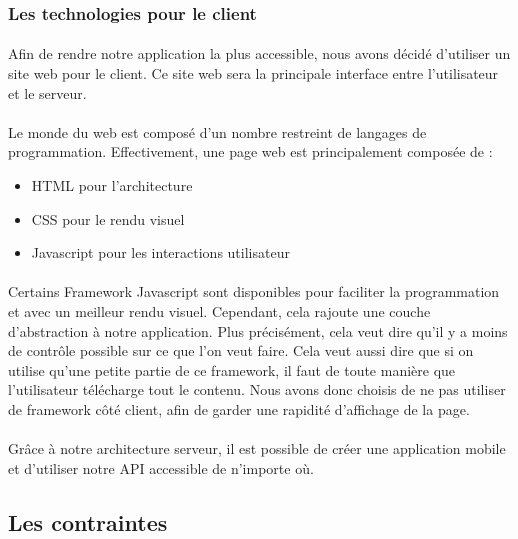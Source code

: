 \documentclass[a4paper, 12pt]{article}
\begin{document}
\subsubsection{Les technologies pour le client}

\paragraph{}Afin de rendre notre application la plus accessible, nous avons décidé d’utiliser un site web pour le client. Ce site web sera la principale interface entre l’utilisateur et le serveur.
\paragraph{}Le monde du web est composé d’un nombre restreint de langages de programmation. Effectivement, une page web est principalement composée de :

\begin{itemize}
	\item HTML pour l’architecture
	\item CSS pour le rendu visuel
	\item Javascript pour les interactions utilisateur
\end{itemize}

\paragraph{}Certains Framework Javascript sont disponibles pour faciliter la programmation et avec un meilleur rendu visuel. Cependant, cela rajoute une couche d’abstraction à notre application. Plus précisément, cela veut dire qu’il y a moins de contrôle possible sur ce que l’on veut faire. Cela veut aussi dire que si on utilise qu’une petite partie de ce framework, il faut de toute manière que l’utilisateur télécharge tout le contenu. Nous avons donc choisis de ne pas utiliser de framework côté client, afin de garder une rapidité d’affichage de la page.
\paragraph{}Grâce à notre architecture serveur, il est possible de créer une application mobile et d’utiliser notre API accessible de n’importe où.

\subsection{Les contraintes}
\end{document}
